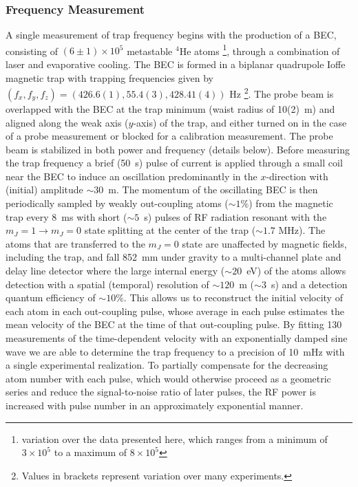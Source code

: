 \documentclass[%
 amsmath,amssymb,
aps,
]{revtex4-2}
\begin{document}
\subsubsection{Frequency Measurement}
A single measurement of trap frequency begins with the production of a BEC, consisting of $(6\pm1) \times 10^{5}$ metastable \(^4\)He atoms \footnote{variation over the data presented here, which ranges from a minimum of $3 \times 10^{5}$ to a maximum of $8 \times 10^{5}$}, through a combination of laser and evaporative cooling.
The BEC is formed in a biplanar quadrupole Ioffe magnetic trap \cite{Dall2007a} with trapping frequencies given by $(f_{x},f_{y},f_{z})= (426.6(1),55.4(3),428.41(4))$ Hz \footnote{Values in brackets represent variation over many experiments.}.
The probe beam is overlapped with the BEC at the trap minimum (waist radius of  10(2)~\textmu{}m) and aligned along the weak axis ($y$-axis) of the trap, and either turned on in the case of a probe measurement or blocked for a calibration measurement. The probe beam is stabilized in both power and frequency (details below). 
Before measuring the trap frequency a brief (50~\textmu{}s) pulse of current is applied through a small coil near the BEC to induce an oscillation predominantly in the $x$-direction with (initial) amplitude \(\sim30\)~\textmu{}m. 
The momentum of the oscillating BEC is then periodically sampled by weakly out-coupling atoms ($\sim1 \% $) from the magnetic trap every 8~ms with short ($\sim5$~\textmu{}s) pulses of RF radiation resonant with the $m_J=1 \rightarrow m_J=0$ state splitting at the center of the trap ($\sim1.7$ MHz). 
The atoms that are transferred to the $m_J=0$ state are unaffected by magnetic fields, including the trap, and fall 852~mm under gravity to a multi-channel plate and delay line detector \cite{Manning:10} where the large internal energy  ($\sim 20$~eV) of the atoms allows detection with a spatial (temporal) resolution of  $\sim 120$~\textmu{}m ($\sim 3$~\textmu{}s) \cite{PhysRevA.97.063601} and a detection quantum efficiency of ${\sim} 10\%$.
This allows us to reconstruct the initial velocity of each atom in each out-coupling pulse, whose average in each pulse estimates the mean velocity of the BEC at the time of that out-coupling pulse. 
By fitting 130 measurements of the time-dependent velocity with an exponentially damped sine wave we are able to determine the trap frequency to a precision of 10~mHz with a single experimental realization. 
To partially compensate for the decreasing atom number with each pulse, which would otherwise proceed as a geometric series and reduce the signal-to-noise ratio of later pulses, the RF power is increased with pulse number in an approximately exponential manner.
\end{document}
